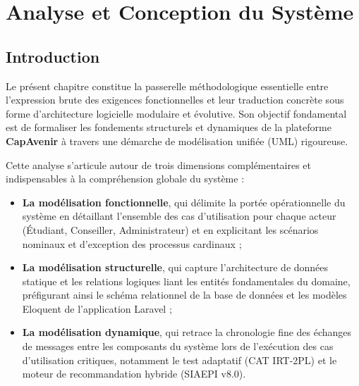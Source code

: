 
\chapter{Analyse et Conception du Système}
\label{chap:analyse_conception}

\section*{Introduction}

Le présent chapitre constitue la passerelle méthodologique essentielle entre l'expression brute des exigences fonctionnelles et leur traduction concrète sous forme d'architecture logicielle modulaire et évolutive. Son objectif fondamental est de formaliser les fondements structurels et dynamiques de la plateforme \textbf{CapAvenir} à travers une démarche de modélisation unifiée (UML) rigoureuse. 

Cette analyse s'articule autour de trois dimensions complémentaires et indispensables à la compréhension globale du système :
\begin{itemize}
    \item \textbf{La modélisation fonctionnelle}, qui délimite la portée opérationnelle du système en détaillant l'ensemble des cas d'utilisation pour chaque acteur (Étudiant, Conseiller, Administrateur) et en explicitant les scénarios nominaux et d'exception des processus cardinaux ;
    \item \textbf{La modélisation structurelle}, qui capture l'architecture de données statique et les relations logiques liant les entités fondamentales du domaine, préfigurant ainsi le schéma relationnel de la base de données et les modèles Eloquent de l'application Laravel ;
    \item \textbf{La modélisation dynamique}, qui retrace la chronologie fine des échanges de messages entre les composants du système lors de l'exécution des cas d'utilisation critiques, notamment le test adaptatif (CAT IRT-2PL) et le moteur de recommandation hybride (SIAEPI v8.0).
\end{itemize}

